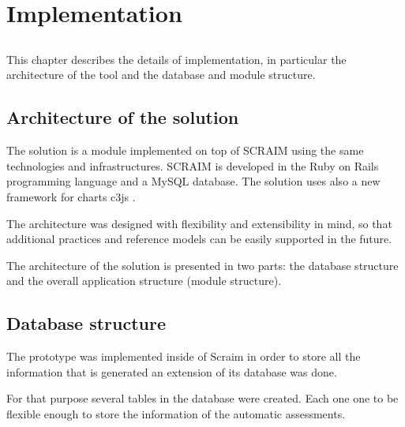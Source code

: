 \chapter{Implementation} \label{chap:implementation}

\section*{}

This chapter describes the details of implementation, in particular the architecture of the tool and the database and module structure.

\section{Architecture of the solution} \label{sec:evaluation}

The solution is a module implemented on top of SCRAIM using the same technologies and infrastructures. SCRAIM is developed in the Ruby on Rails \citep{hansson2009ruby} programming language and a MySQL \citep{MySql} database. The solution uses also a new framework for charts c3js \citep{c3js}.

The architecture was designed with flexibility and extensibility in mind, so that additional practices and reference models can be easily supported in the future.

The architecture of the solution is presented in two parts: the database structure and the overall application structure (module structure).


\section{Database structure}\label{database}

The prototype was implemented inside of Scraim in order to store all the information that is generated an extension of its database was done.

For that purpose several tables in the database were created. Each one one to be flexible enough to store the information of the automatic assessments.

